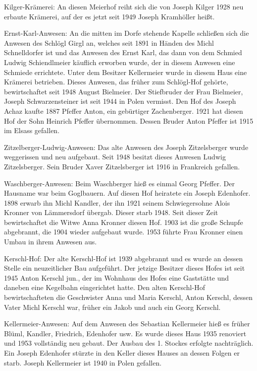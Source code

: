 Kilger-Krämerei: An diesen Meierhof reiht sich die von Joseph Kilger 1928 neu
erbaute Krämerei, auf der es jetzt seit 1949 Joseph Kramhöller heißt.

Ernst-Karl-Anwesen: An die mitten im Dorfe stehende Kapelle schließen sich die
Anwesen des Schlögl Girgl an, welches seit 1891 in Händen des Michl
Schnelldorfer ist und das Anwesen des Ernst Karl, das dann von dem Schmied
Ludwig Schiendlmeier käuflich erworben wurde, der in diesem Anwesen eine
Schmiede errichtete. Unter dem Besitzer Kellermeier wurde in diesem Haus eine
Krämerei betrieben. Dieses Anwesen, das früher zum Schlögl-Hof gehörte,
bewirtschaftet seit 1948 August Bielmeier. Der Stiefbruder der Frau Bielmeier,
Joseph Schwarzensteiner ist seit 1944 in Polen vermisst. Den Hof des Joseph
Achaz kaufte 1887 Pfeffer Anton, ein gebürtiger Zachenberger. 1921 hat diesen
Hof der Sohn Heinrich Pfeffer übernommen. Dessen Bruder Anton Pfeffer ist 1915
im Elsass gefallen.

Zitzelberger-Ludwig-Anwesen: Das alte Anwesen des Joseph Zitzelsberger wurde
weggerissen und neu aufgebaut. Seit 1948 besitzt dieses Anwesen Ludwig
Zitzelsberger. Sein Bruder Xaver Zitzelsberger ist 1916 in Frankreich gefallen.

Waschberger-Anwesen: Beim Waschberger hieß es einmal Georg Pfeffer. Der Hausname
war beim Goglbauern. Auf diesen Hof heiratete ein Joseph Edenhofer. 1898 erwarb
ihn Michl Kandler, der ihn 1921 seinem Schwiegersohne Alois Kronner von
Lämmersdorf übergab. Dieser starb 1948. Seit dieser Zeit bewirtschaftet die
Witwe Anna Kronner diesen Hof. 1903 ist die große Schupfe abgebrannt, die 1904
wieder aufgebaut wurde. 1953 führte Frau Kronner einen Umbau in ihrem Anwesen
aus.

Kerschl-Hof: Der alte Kerschl-Hof ist 1939 abgebrannt und es wurde an dessen
Stelle ein neuzeitlicher Bau aufgeführt. Der jetzige Besitzer dieses Hofes ist
seit 1945 Anton Kerschl jun., der im Wohnhaus des Hofes eine Gaststätte und
daneben eine Kegelbahn eingerichtet hatte. Den alten Kerschl-Hof
bewirtschafteten die Geschwister Anna und Maria Kerschl, Anton Kerschl, dessen
Vater Michl Kerschl war, früher ein Jakob und auch ein Georg Kerschl.

Kellermeier-Anwesen: Auf dem Anwesen des Sebastian Kellermeier hieß es früher
Blüml, Kandler, Friedrich, Edenhofer usw. Es wurde dieses Haus 1935 renoviert
und 1953 vollständig neu gebaut. Der Ausbau des 1. Stockes erfolgte
nachträglich. Ein Joseph Edenhofer stürzte in den Keller dieses Hauses an dessen
Folgen er starb. Joseph Kellermeier ist 1940 in Polen gefallen.


